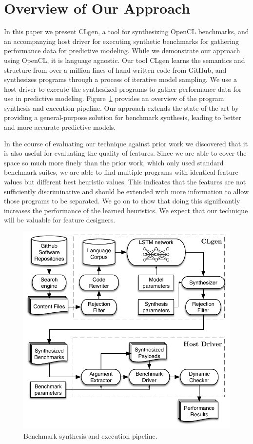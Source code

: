 \section{Overview of Our Approach}\label{sec:overview}

In this paper we present CLgen, a tool for synthesizing OpenCL benchmarks, and an accompanying host driver for executing synthetic benchmarks for gathering performance data for predictive modeling. While we demonstrate our approach using OpenCL, it is language agnostic. Our tool CLgen learns the semantics and structure from over a million lines of hand-written code from GitHub, and synthesizes programs through a process of iterative model sampling. We use a host driver to execute the synthesized programs to gather performance data for use in predictive modeling. Figure~\ref{fig:pipeline} provides an overview of the program synthesis and execution pipeline. Our approach extends the state of the art by providing a general-purpose solution for benchmark synthesis, leading to better and more accurate predictive models.

In the course of evaluating our technique against prior work we discovered that it is also useful for evaluating the quality of features. Since we are able to cover the space so much more finely than the prior work, which only used standard benchmark suites, we are able to find multiple programs with identical feature values but different best heuristic values. This indicates that the features are not sufficiently discriminative and should be extended with more information to allow those programs to be separated. We go on to show that doing this significantly increases the performance of the learned heuristics. We expect that our technique will be valuable for feature designers.

\begin{figure}
  \centering%
  \includegraphics[width=.75\columnwidth]{img/pipeline}%
  \caption{Benchmark synthesis and execution pipeline.}%
  \label{fig:pipeline}
\end{figure}

